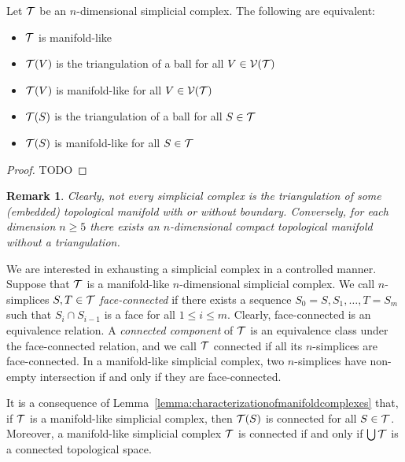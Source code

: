 \documentclass[a4paper]{article}
\newtheorem{remark}{Remark}
\begin{document}
\begin{lemma}\label{lemma:characterizationofmanifoldcomplexes}
    Let ${\mathcal T}$ be an $n$-dimensional simplicial complex. The following are equivalent:
    \begin{itemize}
     \item ${\mathcal T}$ is manifold-like
     \item ${\mathcal T}(V)$ is the triangulation of a ball for all $V \in {\mathcal V}({\mathcal T})$
     \item ${\mathcal T}(V)$ is manifold-like for all $V \in {\mathcal V}({\mathcal T})$
     \item ${\mathcal T}(S)$ is the triangulation of a ball for all $S \in {\mathcal T}$
     \item ${\mathcal T}(S)$ is manifold-like for all $S \in {\mathcal T}$
    \end{itemize}
\end{lemma}
\begin{proof}
    \color{red} TODO
\end{proof}



\begin{remark}
    Clearly, not every simplicial complex is the triangulation of some (embedded) topological manifold with or without boundary. 
    Conversely, for each dimension $n \geq 5$ there exists an $n$-dimensional compact topological manifold without a triangulation. %
\end{remark}


We are interested in exhausting a simplicial complex in a controlled manner. 
Suppose that ${\mathcal T}$ is a manifold-like $n$-dimensional simplicial complex. 
We call $n$-simplices $S,T \in {\mathcal T}$ \emph{face-connected} if there exists a sequence $S_0=S,S_1,\dots,T=S_m$ such that $S_{i} \cap S_{i-1}$ is a face for all $1 \leq i \leq m$. Clearly, face-connected is an equivalence relation. A \emph{connected component} of ${\mathcal T}$ is an equivalence class under the face-connected relation, and we call ${\mathcal T}$ connected if all its $n$-simplices are face-connected. 
In a manifold-like simplicial complex, two $n$-simplices have non-empty intersection if and only if they are face-connected. 

It is a consequence of Lemma~\ref{lemma:characterizationofmanifoldcomplexes} that,
if ${\mathcal T}$ is a manifold-like simplicial complex, then ${\mathcal T}(S)$ is connected for all $S \in {\mathcal T}$.
Moreover, a manifold-like simplicial complex ${\mathcal T}$ is connected if and only if $\bigcup{\mathcal T}$ is a connected topological space. 
\end{document}

